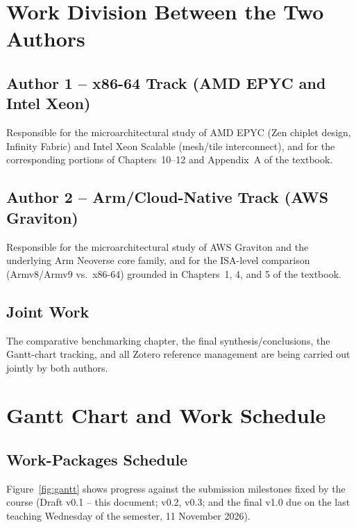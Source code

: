 \documentclass[11pt,a4paper]{article}
\begin{document}
\section{Work Division Between the Two Authors}

\subsection{Author 1 -- x86-64 Track (AMD EPYC and Intel Xeon)}
Responsible for the microarchitectural study of AMD EPYC (Zen chiplet design, Infinity
Fabric) and Intel Xeon Scalable (mesh/tile interconnect), and for the corresponding portions
of Chapters~10--12 and Appendix~A of the textbook.

\subsection{Author 2 -- Arm/Cloud-Native Track (AWS Graviton)}
Responsible for the microarchitectural study of AWS Graviton and the underlying Arm Neoverse
core family, and for the ISA-level comparison (Armv8/Armv9 vs.\ x86-64) grounded in
Chapters~1, 4, and 5 of the textbook.

\subsection{Joint Work}
The comparative benchmarking chapter, the final synthesis/conclusions, the Gantt-chart
tracking, and all Zotero reference management are being carried out jointly by both authors.

\section{Gantt Chart and Work Schedule}

\subsection{Work-Packages Schedule}
Figure~\ref{fig:gantt} shows progress against the submission milestones fixed by the course
(Draft v0.1 -- this document; v0.2, v0.3; and the final v1.0 due on the last teaching Wednesday
of the semester, 11 November 2026).
\end{document}
